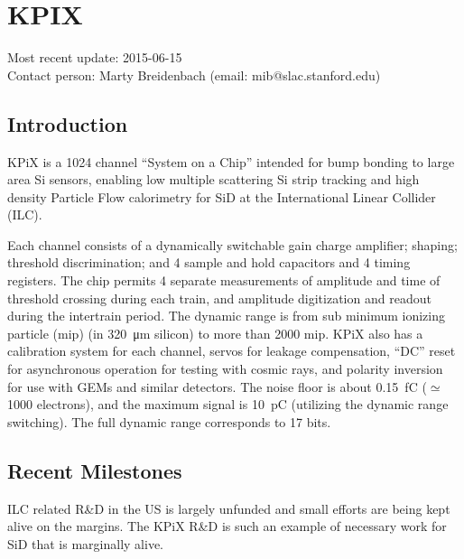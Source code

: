 \section{KPIX}
Most recent update: 2015-06-15 \\
Contact person: Marty Breidenbach (email: mib@slac.stanford.edu)
\subsection{Introduction}
KPiX is a 1024 channel ``System on a Chip'' intended for bump bonding to large area Si sensors, enabling low multiple scattering Si strip tracking and high density Particle Flow calorimetry for SiD at the International Linear Collider (ILC).

Each channel consists of a dynamically switchable gain charge amplifier; shaping; threshold discrimination; and 4 sample and hold capacitors and 4 timing registers. The chip permits 4 separate measurements of amplitude and time of threshold crossing during each train, and amplitude digitization and readout during the intertrain period. The dynamic range is from sub minimum ionizing particle (mip) (in \SI{320}{\micro\meter} silicon) to more than 2000 mip. KPiX also has a calibration system for each channel, servos for leakage compensation, ``DC'' reset for asynchronous operation for testing with cosmic rays, and polarity inversion for use with GEMs and similar detectors. The noise floor is about \SI{0.15}{fC} ($\simeq$ 1000 electrons), and the maximum signal is \SI{10}{pC} (utilizing the dynamic range switching). The full dynamic range corresponds to 17 bits.

\subsection{Recent Milestones}
ILC related R\&D in the US is largely unfunded and small efforts are being kept alive on the margins. The KPiX R\&D is such an example of necessary work for SiD that is marginally alive.
